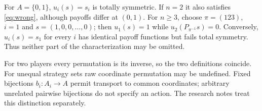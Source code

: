 \begin{example}
For $A=\{0,1\}$, $u_i(s)=s_i$ is totally symmetric. If $n=2$ it also
satisfies \eqref{eq:wrong}, although payoffs differ at $(0,1)$.
For $n\ge3$, choose $\pi=(123)$, $i=1$ and $s=(1,0,0,\ldots,0)$;
then $u_1(s)=1$ while $u_2(P_{\pi^{-1}}s)=0$.
Conversely, $u_i(s)=s_1$ for every $i$ has identical payoff functions but
fails total symmetry. Thus neither part of the characterization may be omitted.
\end{example}

\begin{remark}
For two players every permutation is its inverse, so the two definitions
coincide. For unequal strategy sets raw coordinate permutation may be
undefined. Fixed bijections $b_i:A_i\to A$ permit transport to common
coordinates; arbitrary unrelated pairwise bijections do not specify an action.
The research notes treat this distinction separately.
\end{remark}
